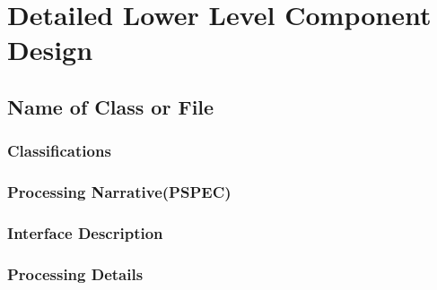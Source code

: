 \section{Detailed Lower Level Component Design}
\label{sec:lower}

\subsection{Name of Class or File}
\label{sec:class}

\subsubsection{Classifications}
\label{sec:classifications}

\subsubsection{Processing Narrative(PSPEC)}
\label{sec:pspec}

\subsubsection{Interface Description}
\label{sec:interface}

\subsubsection{Processing Details}
\label{sec:details}

